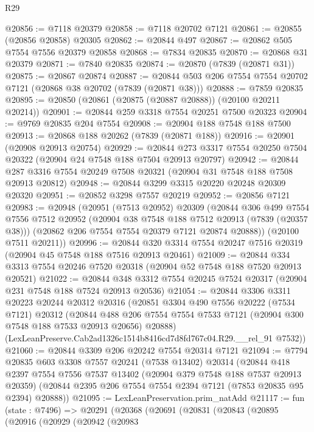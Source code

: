 \begin{lexlean}{R29}
\begin{coremodule}
@20856 := @7118 @20379
@20858 := @7118 @20702 @7121
@20861 := @20855 (@20856 @20858) @20305
@20862 := @20844 @497
@20867 := @20862 @505 @7554 @7556 @20379 @20858
@20868 := @7834 @20835
@20870 := @20868 @31 @20379
@20871 := @7840 @20835
@20874 := @20870 (@7839 (@20871 @31))
@20875 := @20867 @20874
@20887 := @20844 @503 @206 @7554 @7554 @20702 @7121 (@20868 @38 @20702 (@7839 (@20871 @38)))
@20888 := @7859 @20835
@20895 := @20850 (@20861 (@20875 (@20887 @20888)) (@20100 @20211 @20214))
@20901 := @20844 @259 @3318 @7554 @20251 @7500 @20323
@20904 := @9769 @20835 @204 @7554
@20908 := @20904 @188 @7548 @188 @7500
@20913 := @20868 @188 @20262 (@7839 (@20871 @188))
@20916 := @20901 (@20908 @20913 @20754)
@20929 := @20844 @273 @3317 @7554 @20250 @7504 @20322 (@20904 @24 @7548 @188 @7504 @20913 @20797)
@20942 := @20844 @287 @3316 @7554 @20249 @7508 @20321 (@20904 @31 @7548 @188 @7508 @20913 @20812)
@20948 := @20844 @3299 @3315 @20220 @20248 @20309 @20320
@20951 := @20852 @3298 @7557 @20219
@20952 := @20856 @7121
@20983 := @20948
    (@20951
      (@7513 @20952)
      @20309
      (@20844
        @306
        @499
        @7554
        @7556
        @7512
        @20952
        (@20904 @38 @7548 @188 @7512 @20913 (@7839 (@20357 @38)))
        (@20862 @206 @7554 @7554 @20379 @7121 @20874 @20888))
      (@20100 @7511 @20211))
@20996 := @20844 @320 @3314 @7554 @20247 @7516 @20319 (@20904 @45 @7548 @188 @7516 @20913 @20461)
@21009 := @20844 @334 @3313 @7554 @20246 @7520 @20318 (@20904 @52 @7548 @188 @7520 @20913 @20521)
@21022 := @20844 @348 @3312 @7554 @20245 @7524 @20317 (@20904 @231 @7548 @188 @7524 @20913 @20536)
@21054 := @20844
    @3306
    @3311
    @20223
    @20244
    @20312
    @20316
    (@20851
      @3304
      @490
      @7556
      @20222
      (@7534 @7121)
      @20312
      (@20844 @488 @206 @7554 @7554 @7533 @7121 (@20904 @300 @7548 @188 @7533 @20913 @20656) @20888)
      (LexLeanPreserve.Cab2ad1326c1514b8416cd7d8fd767c04.R29.__rel_91 @7532))
@21060 := @20844 @3309 @206 @20242 @7554 @20314 @7121
@21094 := @7794
    @20835
    @603
    @3308
    @7557
    @20241
    (@7538 @13402)
    @20314
    (@20844
      @418
      @2397
      @7554
      @7556
      @7537
      @13402
      (@20904 @379 @7548 @188 @7537 @20913 @20359)
      (@20844 @2395 @206 @7554 @7554 @2394 @7121 (@7853 @20835 @95 @2394) @20888))
@21095 := LexLeanPreservation.prim_natAdd
@21117 := fun (state : @7496) =>
  @20291
    (@20368
      (@20691
        (@20831
          (@20843
            (@20895
              (@20916
                (@20929
                  (@20942
                    (@20983

\end{coremodule}
\end{lexlean}
